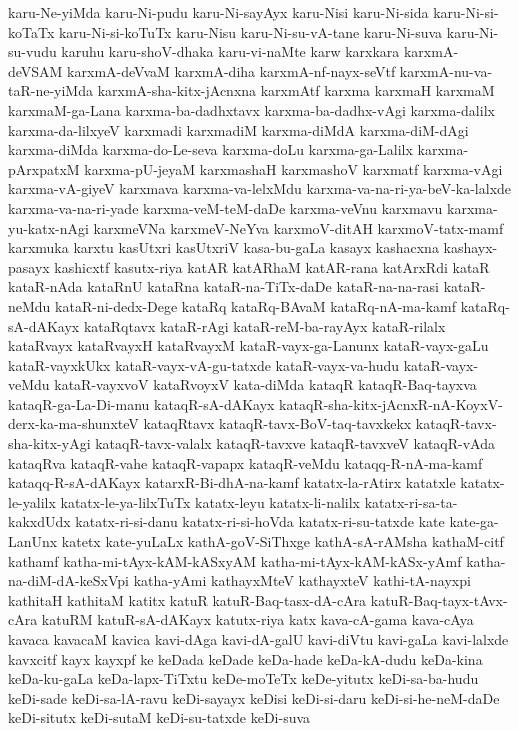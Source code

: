 {karu-Ne-yiMda
karu-Ni-pudu
karu-Ni-sayAyx
karu-Nisi
karu-Ni-sida
karu-Ni-si-koTaTx
karu-Ni-si-koTuTx
karu-Nisu
karu-Ni-su-vA-tane
karu-Ni-suva
karu-Ni-su-vudu
karuhu
karu-shoV-dhaka
karu-vi-naMte
karw
karxkara
karxmA-deVSAM
karxmA-deVvaM
karxmA-diha
karxmA-nf-nayx-seVtf
karxmA-nu-va-taR-ne-yiMda
karxmA-sha-kitx-jAcnxna
karxmAtf
karxma
karxmaH
karxmaM
karxmaM-ga-Lana
karxma-ba-dadhxtavx
karxma-ba-dadhx-vAgi
karxma-dalilx
karxma-da-lilxyeV
karxmadi
karxmadiM
karxma-diMdA
karxma-diM-dAgi
karxma-diMda
karxma-do-Le-seva
karxma-doLu
karxma-ga-Lalilx
karxma-pArxpatxM
karxma-pU-jeyaM
karxmashaH
karxmashoV
karxmatf
karxma-vAgi
karxma-vA-giyeV
karxmava
karxma-va-lelxMdu
karxma-va-na-ri-ya-beV-ka-lalxde
karxma-va-na-ri-yade
karxma-veM-teM-daDe
karxma-veVnu
karxmavu
karxma-yu-katx-nAgi
karxmeVNa
karxmeV-NeYva
karxmoV-ditAH
karxmoV-tatx-mamf
karxmuka
karxtu
kasUtxri
kasUtxriV
kasa-bu-gaLa
kasayx
kashacxna
kashayx-pasayx
kashicxtf
kasutx-riya
katAR
katARhaM
katAR-rana
katArxRdi
kataR
kataR-nAda
kataRnU
kataRna
kataR-na-TiTx-daDe
kataR-na-na-rasi
kataR-neMdu
kataR-ni-dedx-Dege
kataRq
kataRq-BAvaM
kataRq-nA-ma-kamf
kataRq-sA-dAKayx
kataRqtavx
kataR-rAgi
kataR-reM-ba-rayAyx
kataR-rilalx
kataRvayx
kataRvayxH
kataRvayxM
kataR-vayx-ga-Lanunx
kataR-vayx-gaLu
kataR-vayxkUkx
kataR-vayx-vA-gu-tatxde
kataR-vayx-va-hudu
kataR-vayx-veMdu
kataR-vayxvoV
kataRvoyxV
kata-diMda
kataqR
kataqR-Baq-tayxva
kataqR-ga-La-Di-manu
kataqR-sA-dAKayx
kataqR-sha-kitx-jAcnxR-nA-KoyxV-derx-ka-ma-shunxteV
kataqRtavx
kataqR-tavx-BoV-taq-tavxkekx
kataqR-tavx-sha-kitx-yAgi
kataqR-tavx-valalx
kataqR-tavxve
kataqR-tavxveV
kataqR-vAda
kataqRva
kataqR-vahe
kataqR-vapapx
kataqR-veMdu
kataqq-R-nA-ma-kamf
kataqq-R-sA-dAKayx
katarxR-Bi-dhA-na-kamf
katatx-la-rAtirx
katatxle
katatx-le-yalilx
katatx-le-ya-lilxTuTx
katatx-leyu
katatx-li-nalilx
katatx-ri-sa-ta-kakxdUdx
katatx-ri-si-danu
katatx-ri-si-hoVda
katatx-ri-su-tatxde
kate
kate-ga-LanUnx
katetx
kate-yuLaLx
kathA-goV-SiThxge
kathA-sA-rAMsha
kathaM-citf
kathamf
katha-mi-tAyx-kAM-kASxyAM
katha-mi-tAyx-kAM-kASx-yAmf
katha-na-diM-dA-keSxVpi
katha-yAmi
kathayxMteV
kathayxteV
kathi-tA-nayxpi
kathitaH
kathitaM
katitx
katuR
katuR-Baq-tasx-dA-cAra
katuR-Baq-tayx-tAvx-cAra
katuRM
katuR-sA-dAKayx
katutx-riya
katx
kava-cA-gama
kava-cAya
kavaca
kavacaM
kavica
kavi-dAga
kavi-dA-galU
kavi-diVtu
kavi-gaLa
kavi-lalxde
kavxcitf
kayx
kayxpf
ke
keDada
keDade
keDa-hade
keDa-kA-dudu
keDa-kina
keDa-ku-gaLa
keDa-lapx-TiTxtu
keDe-moTeTx
keDe-yitutx
keDi-sa-ba-hudu
keDi-sade
keDi-sa-lA-ravu
keDi-sayayx
keDisi
keDi-si-daru
keDi-si-he-neM-daDe
keDi-situtx
keDi-sutaM
keDi-su-tatxde
keDi-suva
}
